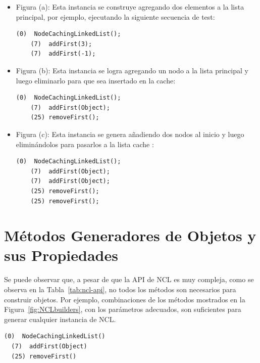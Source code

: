 \begin{itemize}
\item Figura (a): Esta instancia se construye agregando dos elementos a la lista
    principal, por ejemplo, ejecutando la siguiente secuencia de test:
\vspace{5pt} 
    \begin{lstlisting}[numbers=none,label=fig:NCLbuilders_a,xleftmargin=0pt]
    (0)  NodeCachingLinkedList();
    (7)  addFirst(3);
    (7)  addFirst(-1);
    \end{lstlisting}

\item Figura (b):
    Esta instancia se logra agregando un nodo  a la lista principal y luego eliminarlo para que sea insertado en la cache:
    \vspace{5pt} 

    \begin{lstlisting}[numbers=none,label=fig:NCLbuilders_b, xleftmargin=0pt]
    (0)  NodeCachingLinkedList();
    (7)  addFirst(Object);
    (25) removeFirst();
    \end{lstlisting}

\item Figura (c): 
    Esta instancia se genera añadiendo dos nodos al inicio y luego eliminándolos
    para pasarlos a la lista cache :
    \vspace{5pt} 

    \begin{lstlisting}[numbers=none,label=fig:NCLbuilders_c, xleftmargin=0pt]
    (0)  NodeCachingLinkedList();
    (7)  addFirst(Object); 
    (7)  addFirst(Object); 
    (25) removeFirst();
    (25) removeFirst();
    \end{lstlisting}
\end{itemize}



\section{Métodos Generadores de Objetos y sus Propiedades}

Se puede observar que, a pesar de que la API de NCL es muy compleja, como se observa en la Tabla~\ref{tab:ncl-api}, no todos los métodos son necesarios para construir objetos. 
Por ejemplo, combinaciones de los métodos mostrados en la Figura~\ref{fig:NCLbuilders}, con los parámetros adecuados, son suficientes para generar cualquier instancia de NCL.
\vspace{5pt} 
\begin{lstlisting}[numbers=none,label=fig:NCLbuilders, caption=Conjunto de métodos generadores de objetos para NCL]
  (0)  NodeCachingLinkedList()
  (7)  addFirst(Object)
  (25) removeFirst()
\end{lstlisting}

